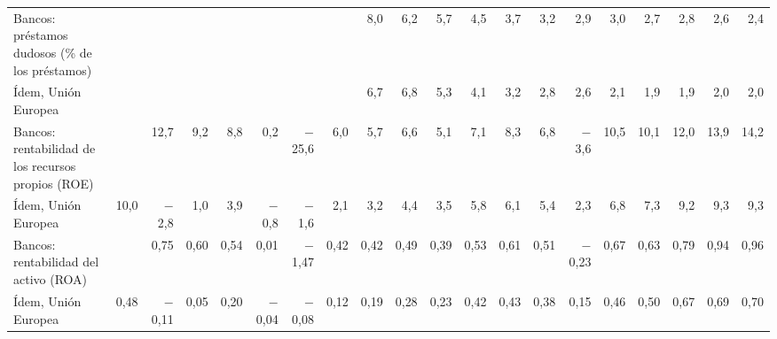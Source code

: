 \begin{tabular}{@{}>{\raggedright\arraybackslash}p{\dimexpr\anchoetq-\tabcolsep\relax}*{19}{N}@{}}
Bancos: préstamos dudosos (\% de los préstamos) &  &  &  &  &  &  &  & 8{,}0 & 6{,}2 & 5{,}7 & 4{,}5 & 3{,}7 & 3{,}2 & 2{,}9 & 3{,}0 & 2{,}7 & 2{,}8 & 2{,}6 & 2{,}4 \\
\hspace*{0.8em}Ídem, Unión Europea &  &  &  &  &  &  &  & 6{,}7 & 6{,}8 & 5{,}3 & 4{,}1 & 3{,}2 & 2{,}8 & 2{,}6 & 2{,}1 & 1{,}9 & 1{,}9 & 2{,}0 & 2{,}0 \\
Bancos: rentabilidad de los recursos propios (ROE) &  & 12{,}7 & 9{,}2 & 8{,}8 & 0{,}2 & $-$25{,}6 & 6{,}0 & 5{,}7 & 6{,}6 & 5{,}1 & 7{,}1 & 8{,}3 & 6{,}8 & $-$3{,}6 & 10{,}5 & 10{,}1 & 12{,}0 & 13{,}9 & 14{,}2 \\
\hspace*{0.8em}Ídem, Unión Europea & 10{,}0 & $-$2{,}8 & 1{,}0 & 3{,}9 & $-$0{,}8 & $-$1{,}6 & 2{,}1 & 3{,}2 & 4{,}4 & 3{,}5 & 5{,}8 & 6{,}1 & 5{,}4 & 2{,}3 & 6{,}8 & 7{,}3 & 9{,}2 & 9{,}3 & 9{,}3 \\
Bancos: rentabilidad del activo (ROA) &  & 0{,}75 & 0{,}60 & 0{,}54 & 0{,}01 & $-$1{,}47 & 0{,}42 & 0{,}42 & 0{,}49 & 0{,}39 & 0{,}53 & 0{,}61 & 0{,}51 & $-$0{,}23 & 0{,}67 & 0{,}63 & 0{,}79 & 0{,}94 & 0{,}96 \\
\hspace*{0.8em}Ídem, Unión Europea & 0{,}48 & $-$0{,}11 & 0{,}05 & 0{,}20 & $-$0{,}04 & $-$0{,}08 & 0{,}12 & 0{,}19 & 0{,}28 & 0{,}23 & 0{,}42 & 0{,}43 & 0{,}38 & 0{,}15 & 0{,}46 & 0{,}50 & 0{,}67 & 0{,}69 & 0{,}70 \\
\bottomrule
\end{tabular}
